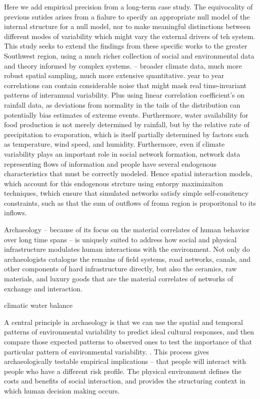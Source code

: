 \documentclass[fleqn,10pt]{wlscirep}
\begin{document}
Here we add empirical precision from a long-term case study. The equivocality of previous sutides arises from a fialure to specify an appropriate null model of the internal structure for a null model, nor to make meaningful distinctions between different modes of variability which might vary the external drivers of teh system. This study seeks to extend the findings from these specific works to the greater Southwest region, using a much richer collection of social and environmental data and theory informed by complex systems. -- broader climate data, much more robust spatial sampling, much more extensive quantitative. year to year correlations can contain considerable noise that might mask real time-invariant patterns of interannual variability. Plus using linear correlation coefficient's on rainfall data, as deviations from normality in the tails of the distribution can potentially bias estimates of extreme events. Furthermore, water availability for food production is not merely determined by rainfall, but by the relative rate of precipitation to evaporation, which is itself partially determined by factors such as temperature, wind speed, and humidity. Furthermore, even if climate variability plays an important role in social network formation, network data representing flows of information and people have several endogenous characteristics that must be correctly modeled. Hence spatial interaction models, which account for this endogenous strcture using entorpy maximizaiton techniques, twhich ensure that simulated networks satisfy simple self-consitency constraints, such as that the sum of outflows of froma region is proporitonal to its inflows.


Archaeology -- because of its focus on the material correlates of human behavior over long time spans -- is uniquely suited to address how social and physical infrastructure modulates human interactions with the environment. Not only do archaeologists catalogue the remains of field systems, road networks, canals, and other components of hard infrastructure directly, but also the ceramics, raw materials, and luxury goods that are the material correlates of networks of exchange and interaction. 

climatic water balance


A central principle in archaeology is that we can use the spatial and temporal patterns of environmental variability to predict ideal cultural responses, and then compare those expected patterns to observed ones to test the importance of that particular pattern of environmental variability. \cite{halstead1989}. This process gives archaeologically testable empirical implications -- that people will interact with people who have a different risk profile. The physical environment defines the costs and benefits of social interaction, and provides the structuring context in which human decision making occurs.
\end{document}
